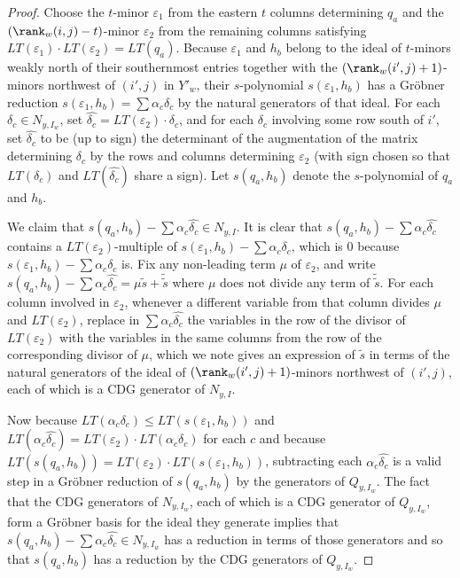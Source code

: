 \begin{proof}
Choose the $t$-minor $\varepsilon_1$ from the eastern $t$ columns determining $q_a$ and the $(\rank_w(i,j)-t)$-minor $\varepsilon_2$ from the remaining columns satisfying $LT(\varepsilon_1) \cdot LT(\varepsilon_2) = LT(q_a)$.  Because $\varepsilon_1$ and $h_b$ belong to the ideal of $t$-minors weakly north of their southernmost entries together with the $(\rank_w(i',j)+1)$-minors northwest of $(i',j)$ in $Y'_w$, their $s$-polynomial $s(\varepsilon_1,h_b)$ has a Gr\"obner reduction $s(\varepsilon_1,h_b) = \sum \alpha_c \delta_c $ by the natural generators of that ideal.  For each $\delta_c \in N_{y,I_w}$, set $\widehat{\delta_c} = LT(\varepsilon_2) \cdot \delta_c$, and for each $\delta_c$ involving some row south of $i'$, set $\widehat{\delta_c}$ to be (up to sign) the determinant of the augmentation of the matrix determining $\delta_c$ by the rows and columns determining $\varepsilon_2$ (with sign chosen so that $LT(\delta_c)$ and $LT(\widehat{\delta_c})$ share a sign).  Let $s(q_a,h_b)$ denote the $s$-polynomial of $q_a$ and $h_b$.  

We claim that $s(q_a,h_b)-\sum \alpha_c \widehat{\delta_c} \in N_{y,I}$.  It is clear that $s(q_a,h_b)-\sum \alpha_c \widehat{\delta_c}$ contains a $LT(\varepsilon_2)$-multiple of $s(\varepsilon_1,h_b)-\sum \alpha_c \delta_c$, which is $0$ because $s(\varepsilon_1,h_b)-\sum \alpha_c \delta_c$ is.  Fix any non-leading term $\mu$ of $\varepsilon_2$, and write $s(q_a,h_b)-\sum \alpha_c \widehat{\delta_c} = \mu \tilde{s}+\tilde{\tilde{s}}$ where $\mu$ does not divide any term of $\tilde{\tilde{s}}$.  For each column involved in $\varepsilon_2$, whenever a different variable from that column divides $\mu$ and $LT(\varepsilon_2)$, replace in $\sum \alpha_c \widehat{\delta_c}$ the variables in the row of the divisor of $LT(\varepsilon_2)$ with the variables in the same columns from the row of the corresponding divisor of $\mu$, which we note gives an expression of $\tilde{s}$ in terms of the natural generators of the ideal of $(\rank_w(i',j)+1)$-minors northwest of $(i',j)$, each of which is a CDG generator of $N_{y,I}$.

Now because $LT(\alpha_c\delta_c) \leq LT(s(\varepsilon_1,h_b))$ and $LT(\alpha_c \widehat{\delta_c}) = LT(\varepsilon_2) \cdot LT(\alpha_c\delta_c)$ for each $c$ and because $LT(s(q_a,h_b)) = LT(\varepsilon_2) \cdot LT(s(\varepsilon_1,h_b))$, subtracting each $\alpha_c \widehat{\delta_c}$ is a valid step in a Gr\"obner reduction of $s(q_a,h_b)$ by the generators of $Q_{y,I_w}$.  The fact that the CDG generators of $N_{y,I_w}$, each of which is a CDG generator of $Q_{y,I_w}$, form a Gr\"obner basis for the ideal they generate implies that $s(q_a,h_b)-\sum \alpha_c \widehat{\delta_c} \in N_{y,I_w}$ has a reduction in terms of those generators and so that $s(q_a,h_b)$ has a reduction by the CDG generators of $Q_{y,I_w}$.


\end{proof}
